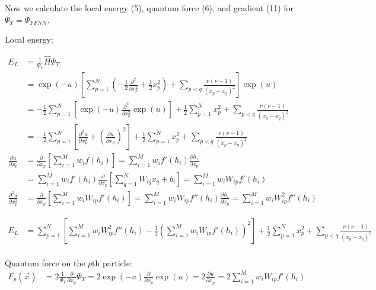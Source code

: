 \documentclass[12pt]{article}
\begin{document}
\noindent Now we calculate the local energy (5), quantum force (6), and gradient (11) for $\Psi_T = \Psi_{FFNN}$.

\noindent Local energy:

\begin{align*}
E_L &= \frac{1}{\Psi_T} \hat{H} \Psi_T\\
&= \exp\left(- u \right) \left[ \sum_{p=1}^{N} \left( -\frac{1}{2} \frac{\partial^2}{\partial x_p^2} + \frac{1}{2} x_p^2 \right) + \sum_{p<q} \frac{\nu (\nu -1)}{(x_p-x_q)^2} \right] \exp\left( u \right)\\
&=  -\frac{1}{2} \sum_{p=1}^{N} \left[  \exp\left(- u \right) \frac{\partial^2}{\partial x_p^2}  \exp\left( u \right) \right]  +  \frac{1}{2} \sum_{p=1}^{N}  x_p^2  + \sum_{p<q} \frac{\nu (\nu -1)}{(x_p-x_q)^2}\\
&=  -\frac{1}{2} \sum_{p=1}^{N} \left[  \frac{\partial^2 u}{\partial x_p^2} + \left( \frac{\partial u}{\partial x_p} \right)^2 \right]  +  \frac{1}{2} \sum_{p=1}^{N}  x_p^2  + \sum_{p<q} \frac{\nu (\nu -1)}{(x_p-x_q)^2}\\
%
\frac{\partial u}{\partial x_p} 
&=\frac{\partial}{\partial x_p}  \left[ \sum_{i=1}^M w_i f(h_i) \right] 
= \sum_{i=1}^M w_i f'(h_i)\frac{\partial h_i}{\partial x_p} \\
&=\sum_{i=1}^M  w_i f'(h_i)\frac{\partial}{\partial x_p} \left[ \sum_{q=1}^N W_{iq}x_q +b_i \right] = \sum_{i=1}^M w_i W_{ip} f'(h_i)\\
%
\frac{\partial^2 u}{\partial x_p^2} &= \frac{\partial}{\partial x_p} \left[ \sum_{i=1}^M w_i W_{ip} f'(h_i) \right] = \sum_{i=1}^M w_i W_{ip} f''(h_i) \frac{\partial h_i}{\partial x_p} = \sum_{i=1}^M w_i W_{ip}^2 f''(h_i) 
\end{align*}

\begin{align*}
E_L &=  \sum_{p=1}^{N} \left[   \sum_{i=1}^M w_i W_{ip}^2 f''(h_i)  -\frac{1}{2}  \left( \sum_{i=1}^Mw_i W_{ip} f'(h_i)   \right)^2 \right]  +  \frac{1}{2} \sum_{p=1}^{N}  x_p^2  + \sum_{p<q} \frac{\nu (\nu -1)}{(x_p-x_q)^2}\\
\end{align*}

\noindent Quantum force on the $p$th particle:
\begin{align*}
F_p(\vec{x}) &= 2 \frac{1}{\Psi_T} \frac{\partial}{\partial x_p} \Psi_T = 2 \exp(-u) \frac{\partial}{\partial x_p} \exp(u) = 2 \frac{\partial u}{\partial x_p} = 2 \sum_{i=1}^M  w_i W_{ip} f'(h_i) 
\end{align*}
\end{document}
